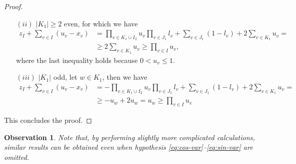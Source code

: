 \documentclass{article}
\newtheorem{observation}[theorem]{Observation}
\begin{document}
\begin{proof}
\begin{itemize}
	\item[\((ii)\)]  \(|K_1| \geq 2\) even, for which we have
	\begin{align*}
		z_I + \sum_{v \in I} (u_v - x_v) & = \prod_{v \in K_1 \cup I_2}u_v \prod_{v \in J_1} l_v+ \sum_{v \in J_1} (1 - l_v) + 2\sum_{v \in K_1}u_v =\\
		& \geq 2\sum_{v \in K_1}u_v  \geq  \prod_{v \in I} u_v,
	\end{align*}
	where the last inequality holds because \(0 < u_v \leq 1\).
	\item[\((iii)\)]  \(|K_1| \) odd, let \(w \in K_1\), then we have
	\begin{align*}
		z_I + \sum_{v \in I} (u_v - x_v) & =  -\prod_{v \in K_1 \cup I_2}u_v \prod_{v \in J_1} l_v+ \sum_{v \in J_1} (1 - l_v) + 2\sum_{v \in K_1}u_v = \\
		& \geq -u_w + 2 u_w = u_w \geq \prod_{v \in I} u_v
	\end{align*}
\end{itemize}
This concludes the proof.
\end{proof}
\begin{observation}
	Note that, by performing slightly more complicated calculations, similar results can be obtained even when hypothesis \eqref{eq:cos-var}--\eqref{eq:sin-var} are omitted.
\end{observation}
\end{document}
